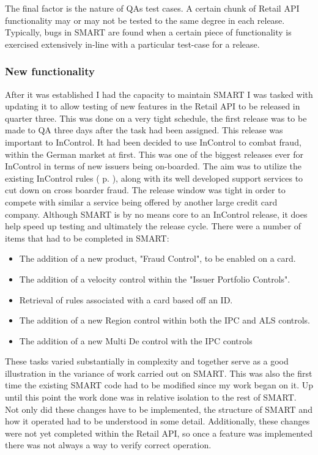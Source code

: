 \documentclass[a4paper, 11pt, titlepage]{article}
\begin{document}
The final factor is the nature of QAs test cases. A certain chunk of Retail API functionality may or may not be tested to the same degree in each release. Typically, bugs in SMART are found when a certain piece of functionality is exercised extensively in-line with a particular test-case for a release.
 
\subsubsection{New functionality} 
After it was established I had the capacity to maintain SMART I was tasked with updating it to allow testing of new features in the Retail API to be released in quarter three. This was done on a very tight schedule, the first release was to be made to QA three days after the task had been assigned. This release was important to InControl. It had been decided to use InControl to combat fraud, within the German market at first. This was one of the biggest releases ever for InControl in terms of new issuers being on-boarded. The aim was to utilize the existing InControl rules ( p. \pageref{rule_types} ), along with its well developed support services to cut down on cross boarder fraud. The release window was tight in order to compete with similar a service being offered by another large credit card company. Although SMART is by no means core to an InControl release, it does help speed up testing and ultimately the release cycle. There were a number of items that had to be completed in SMART: 
\begin{itemize} 
\item The addition of a new product, "Fraud Control", to be enabled on a card. 
\item The addition of a velocity control within the "Issuer Portfolio Controls". 
\item Retrieval of rules associated with a card based off an ID. 
\item The addition of a new Region control within both the IPC and ALS controls. 
\item The addition of a new Multi De control with the IPC controls 
\end{itemize} 
\label{fraud_control}
These tasks varied substantially in complexity and together serve as a good illustration in the variance of work carried out on SMART. This was also the first time the existing SMART code had to be modified since my work began on it. Up until this point the work done was in relative isolation to the rest of SMART. Not only did these changes have to be implemented, the structure of SMART and how it operated had to be understood in some detail. Additionally, these changes were not yet completed within the Retail API, so once a feature was implemented there was not always a way to verify correct operation. 
 
\end{document}
